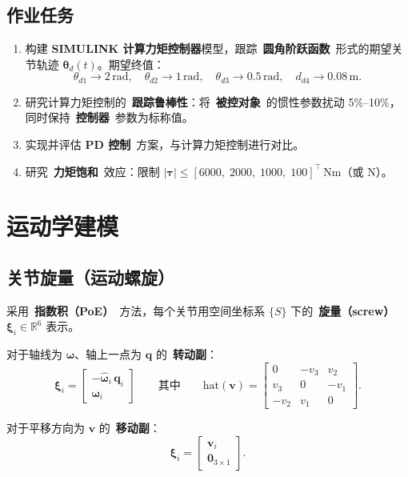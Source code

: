 \documentclass[12pt,a4paper]{ctexart}
\begin{document}
\subsection{作业任务}

\begin{enumerate}[label=\textbf{(\alph*)}, leftmargin=*]
  \item 构建 \textbf{SIMULINK 计算力矩控制器}模型，跟踪\ \textbf{圆角阶跃函数}\ 形式的期望关节轨迹 $\bm{\theta}_d(t)$。期望终值：
  \[
  \theta_{d1}\to 2\,\text{rad},\quad
  \theta_{d2}\to 1\,\text{rad},\quad
  \theta_{d3}\to 0.5\,\text{rad},\quad
  d_{d4}\to 0.08\,\text{m}.
  \]
  \item 研究计算力矩控制的\ \textbf{跟踪鲁棒性}：将\ \textbf{被控对象}\ 的惯性参数扰动 5\%--10\%，同时保持\ \textbf{控制器}\ 参数为标称值。
  \item 实现并评估 \textbf{PD 控制}\ 方案，与计算力矩控制进行对比。
  \item 研究\ \textbf{力矩饱和}\ 效应：限制 $|\bm{\tau}| \le [6000,\;2000,\;1000,\;100]^\top$\,Nm（或 N）。
\end{enumerate}

\section{运动学建模}

\subsection{关节旋量（运动螺旋）}

采用\ \textbf{指数积（PoE）}\ 方法，每个关节用空间坐标系 $\{S\}$ 下的\ \textbf{旋量（screw）} $\bm{\xi}_i \in \mathbb{R}^6$ 表示。

对于轴线为 $\bm{\omega}$、轴上一点为 $\mathbf{q}$ 的\ \textbf{转动副}：
\[
\bm{\xi}_i = \begin{bmatrix} -\hat{\bm{\omega}}_i\,\mathbf{q}_i \\[2pt] \bm{\omega}_i \end{bmatrix}
\qquad\text{其中}\qquad
\text{hat}(\mathbf{v}) = \begin{bmatrix}
0 & -v_3 & v_2 \\
v_3 & 0 & -v_1 \\
-v_2 & v_1 & 0
\end{bmatrix}.
\]

对于平移方向为 $\mathbf{v}$ 的\ \textbf{移动副}：
\[
\bm{\xi}_i = \begin{bmatrix} \mathbf{v}_i \\[2pt] \mathbf{0}_{3\times 1} \end{bmatrix}.
\]
\end{document}
